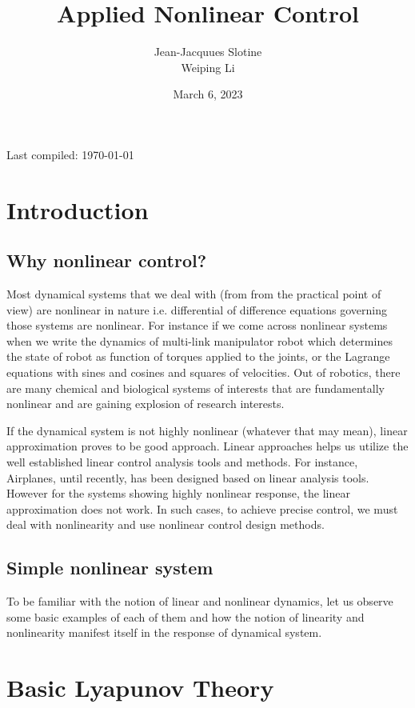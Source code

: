 \documentclass{article}
\title{Applied Nonlinear Control}
\author{Jean-Jacquues Slotine\\Weiping Li}
\date{March 6, 2023}
\begin{document}
\maketitle
Last compiled: \today

\newpage
\tableofcontents
\newpage

\section{Introduction}
\subsection*{Why nonlinear control?}
Most dynamical systems that we deal with (from from the practical point of view) are nonlinear in nature i.e. differential of difference equations governing those systems are nonlinear. For instance if we come across nonlinear systems when we write the dynamics of multi-link manipulator robot which determines the state of robot as function of torques applied to the joints, or the Lagrange equations with sines and cosines and squares of velocities. Out of robotics, there are many chemical and biological systems of interests that are fundamentally nonlinear and are gaining explosion of research interests.

If the dynamical system is not highly nonlinear (whatever that may mean), linear approximation proves to be good approach. Linear approaches helps us utilize the well established linear control analysis tools and methods. For instance, Airplanes, until recently, has been designed based on linear analysis tools. However for the systems showing highly nonlinear response, the linear approximation does not work. In such cases, to achieve precise control, we must deal with nonlinearity and use nonlinear control design methods. 

\subsection*{Simple nonlinear system}

To be familiar with the notion of linear and nonlinear dynamics, let us observe some basic examples of each of them and how the notion of linearity and nonlinearity manifest itself in the response of dynamical system.


\section{Basic Lyapunov Theory}
\end{document}
